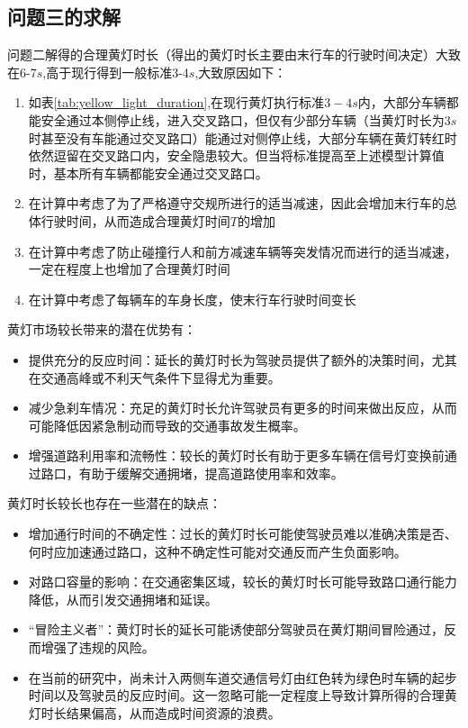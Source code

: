 \documentclass[withoutpreface,bwprint]{cumcmthesis}
\begin{document}
\subsection{问题三的求解}
\normalsize
问题二解得的合理黄灯时长（得出的黄灯时长主要由末行车的行驶时间决定）大致在6-7$s$,高于现行得到一般标准3-4$s$,大致原因如下：
\begin{enumerate}
	\item 如表\ref{tab:yellow_light_duration},在现行黄灯执行标准$3-4s$内，大部分车辆都能安全通过本侧停止线，进入交叉路口，但仅有少部分车辆（当黄灯时长为$3s$时甚至没有车能通过交叉路口）能通过对侧停止线，大部分车辆在黄灯转红时依然逗留在交叉路口内，安全隐患较大。但当将标准提高至上述模型计算值时，基本所有车辆都能安全通过交叉路口。
	\item 在计算中考虑了为了严格遵守交规所进行的适当减速，因此会增加末行车的总体行驶时间，从而造成合理黄灯时间$T$的增加
	\item 在计算中考虑了防止碰撞行人和前方减速车辆等突发情况而进行的适当减速，一定在程度上也增加了合理黄灯时间
	\item 在计算中考虑了每辆车的车身长度，使末行车行驶时间变长
\end{enumerate}
黄灯市场较长带来的潜在优势有：
\begin{itemize}
	\item 提供充分的反应时间：延长的黄灯时长为驾驶员提供了额外的决策时间，尤其在交通高峰或不利天气条件下显得尤为重要。
	\item 减少急刹车情况：充足的黄灯时长允许驾驶员有更多的时间来做出反应，从而可能降低因紧急制动而导致的交通事故发生概率。
	\item 增强道路利用率和流畅性：较长的黄灯时长有助于更多车辆在信号灯变换前通过路口，有助于缓解交通拥堵，提高道路使用率和效率。
\end{itemize}

黄灯时长较长也存在一些潜在的缺点：
\begin{itemize}
	\item 增加通行时间的不确定性：过长的黄灯时长可能使驾驶员难以准确决策是否、何时应加速通过路口，这种不确定性可能对交通反而产生负面影响。
	\item 对路口容量的影响：在交通密集区域，较长的黄灯时长可能导致路口通行能力降低，从而引发交通拥堵和延误。
	\item “冒险主义者”：黄灯时长的延长可能诱使部分驾驶员在黄灯期间冒险通过，反而增强了违规的风险。
	\item 在当前的研究中，尚未计入两侧车道交通信号灯由红色转为绿色时车辆的起步时间以及驾驶员的反应时间。这一忽略可能一定程度上导致计算所得的合理黄灯时长结果偏高，从而造成时间资源的浪费。
\end{itemize}
\end{document}
